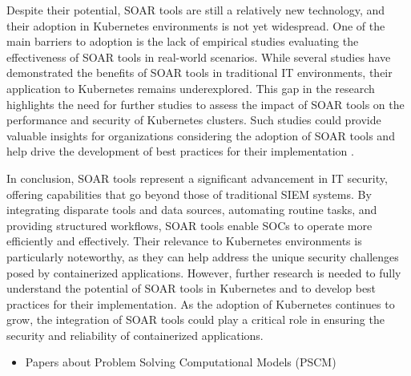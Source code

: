Despite their potential, SOAR tools are still a relatively new technology, and their adoption in Kubernetes environments is not yet widespread. One of the main barriers to adoption is the lack of empirical studies evaluating the effectiveness of SOAR tools in real-world scenarios. While several studies have demonstrated the benefits of SOAR tools in traditional IT environments, their application to Kubernetes remains underexplored. This gap in the research highlights the need for further studies to assess the impact of SOAR tools on the performance and security of Kubernetes clusters. Such studies could provide valuable insights for organizations considering the adoption of SOAR tools and help drive the development of best practices for their implementation \citep{empl2022, bridges2023}.

In conclusion, SOAR tools represent a significant advancement in IT security, offering capabilities that go beyond those of traditional SIEM systems. By integrating disparate tools and data sources, automating routine tasks, and providing structured workflows, SOAR tools enable SOCs to operate more efficiently and effectively. Their relevance to Kubernetes environments is particularly noteworthy, as they can help address the unique security challenges posed by containerized applications. However, further research is needed to fully understand the potential of SOAR tools in Kubernetes and to develop best practices for their implementation. As the adoption of Kubernetes continues to grow, the integration of SOAR tools could play a critical role in ensuring the security and reliability of containerized applications.

 \begin{itemize}
    \item Papers about Problem Solving Computational Models (PSCM)
\end{itemize}
